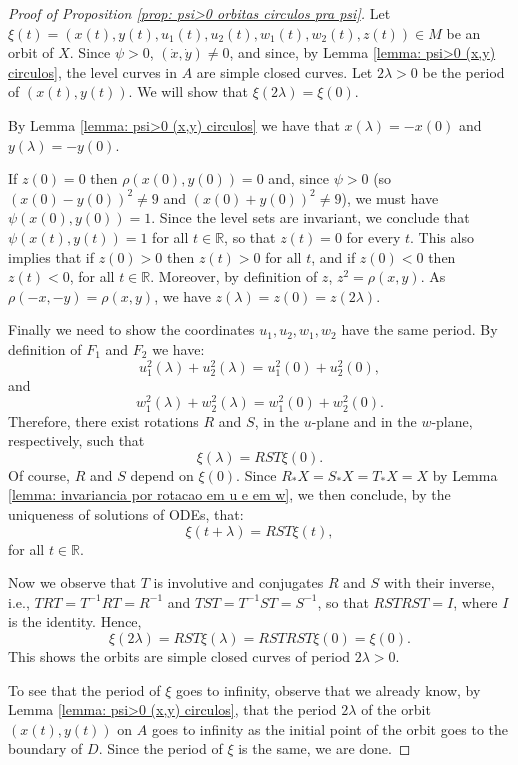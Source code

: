 \documentclass[11pt,reqno]{amsart}
\theoremstyle{plain}
\theoremstyle{definition}
\theoremstyle{remark}
\theoremstyle{plain}
\numberwithin{equation}{section}
\newcommand{\R}{\mathbb{R}}
\begin{document}
									
									\begin{proof}[Proof of Proposition \ref{prop: psi>0 orbitas circulos pra psi}]
									Let $\xi(t)=(x(t),y(t),u_{1}(t),u_{2}(t),w_{1}(t),w_{2}(t),z(t))\in M$ be an orbit of $X$. Since $\psi>0$, $(\dot{x},\dot{y})\neq 0$, and since, by Lemma \ref{lemma: psi>0 (x,y) circulos}, the level curves in $A$ are simple closed curves. Let $2\lambda >0$ be the period of $(x(t),y(t))$. We will show that $\xi(2\lambda)=\xi(0)$.
									
									By  Lemma \ref{lemma: psi>0 (x,y) circulos} we have that $x(\lambda)=-x(0)$ and $y(\lambda)=-y(0)$. 
									
									If $z(0)=0$ then $\rho(x(0),y(0))=0$ and, since $\psi>0$ (so $(x(0)-y(0))^{2}\neq 9$ and $(x(0)+y(0))^{2}\neq 9$), we must have $\psi(x(0),y(0))=1$. Since the level sets are invariant, we conclude that $\psi(x(t),y(t))=1$ for all $t\in \R$, so that $z(t)=0$ for every $t$. This also implies that if $z(0)>0$ then $z(t)>0$ for all $t$, and if $z(0)<0$ then $z(t)<0$, for all $t\in \R$. Moreover, by definition of $z$, $z^{2}=\rho(x,y)$. As $\rho(-x,-y)=\rho(x,y)$, we have  $z(\lambda)=z(0)=z(2\lambda)$.
									
									Finally we need to show the coordinates $u_{1},u_{2},w_{1},w_{2}$ have the same period. By definition of $F_{1}$ and $F_{2}$ we have: $$u_{1}^{2}(\lambda)+u_{2}^{2}(\lambda)=u_{1}^{2}(0)+u_{2}^{2}(0),$$ and $$w_{1}^{2}(\lambda)+w_{2}^{2}(\lambda)=w_{1}^{2}(0)+w_{2}^{2}(0).$$ Therefore, there exist rotations $R$ and $S$, in the $u$-plane and in the $w$-plane, respectively, such that $$\xi(\lambda)=RST\xi(0).$$ Of course, $R$ and $S$ depend on $\xi(0)$. Since $R_{\ast}X=S_{\ast}X=T_{\ast}X=X$ by Lemma \ref{lemma: invariancia por rotacao em u e em w}, we then conclude, by the uniqueness of solutions of ODEs, that: $$\xi(t+\lambda)=RST\xi(t),$$ for all $t\in \R$.
									
									Now we observe that $T$ is involutive and conjugates $R$ and $S$ with their inverse, i.e., $TRT=T^{-1}RT=R^{-1}$ and $TST=T^{-1}ST=S^{-1}$, so that $RSTRST=I$, where $I$ is the identity. Hence, $$\xi(2\lambda)=RST\xi(\lambda)=RSTRST\xi(0)=\xi(0).$$ This shows the orbits are simple closed curves of period $2\lambda>0$.
									
									To see that the period of $\xi$ goes to infinity, observe that we already know, by Lemma \ref{lemma: psi>0 (x,y) circulos}, that the period $2\lambda$ of the orbit $(x(t),y(t))$ on $A$ goes to infinity as the initial point of the orbit goes to the boundary of $D$. Since the period of $\xi$ is the same, we are done.
									\end{proof}   
									
\end{document}

